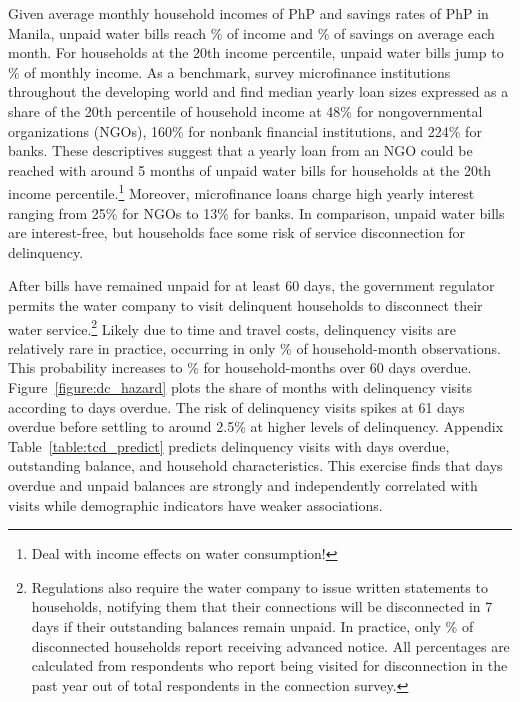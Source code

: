 \documentclass[12pt]{article}
\begin{document}
Given average monthly household incomes of PhP and savings rates of PhP in Manila, unpaid water bills reach \unskip\% of income and \unskip\% of savings on average each month.  For households at the 20th income percentile, unpaid water bills jump to \unskip\% of monthly income.  As a benchmark, \cite{cull2009microfinance} survey microfinance institutions throughout the developing world and find median yearly loan sizes expressed as a share of the 20th percentile of household income at 48\% for nongovernmental organizations (NGOs), 160\% for nonbank financial institutions, and 224\% for banks.  These descriptives suggest that a yearly loan from an NGO could be reached with around 5 months of unpaid water bills for households at the 20th income percentile.\footnote{Deal with income effects on water consumption!}  Moreover, microfinance loans charge high yearly interest ranging from 25\% for NGOs to 13\% for banks.  In comparison, unpaid water bills are interest-free, but households face some risk of service disconnection for delinquency.

After bills have remained unpaid for at least 60 days, the government regulator permits the water company to visit delinquent households to disconnect their water service.\footnote{Regulations also require the water company to issue written statements to households, notifying them that their connections will be disconnected in 7 days if their outstanding balances remain unpaid.  In practice, only \unskip\% of disconnected households report receiving advanced notice.  All percentages are calculated from respondents who report being visited for disconnection in the past year out of total respondents in the connection survey.}  Likely due to time and travel costs, delinquency visits are relatively rare in practice, occurring in only \unskip\% of household-month observations.  This probability increases to \unskip\% for household-months over 60 days overdue.  Figure~\ref{figure:dc_hazard} plots the share of months with delinquency visits according to days overdue.  The risk of delinquency visits spikes at 61 days overdue before settling to around 2.5\% at higher levels of delinquency.  Appendix Table~\ref{table:tcd_predict} predicts delinquency visits with days overdue, outstanding balance, and household characteristics.  This exercise finds that days overdue and unpaid balances are strongly and independently correlated with visits while demographic indicators have weaker associations. %
\end{document}
